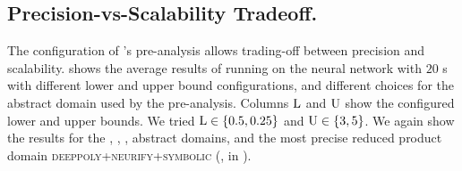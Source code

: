 \subsection{Precision-vs-Scalability Tradeoff.}
The configuration of \libra{}'s pre-analysis allows trading-off between precision and scalability.
 shows the average results of running \libra{} on the neural network with $20$ \relu{}s
with different lower and upper bound configurations, and different choices for the abstract domain used by the pre-analysis.
%
Columns $\textup{L}$ and $\textup{U}$ show the configured lower and upper bounds. We tried $\textup{L} \in \{0.5, 0.25\}$ and $\textup{U} \in \{3, 5\}$. We again show the results for the \boxes, \symbolic, \deeppoly, \neurify{} abstract domains, and the most precise reduced product domain \textsc{deeppoly+neurify+symbolic} (\ie, \reducedproduct{} in ).
%
%

